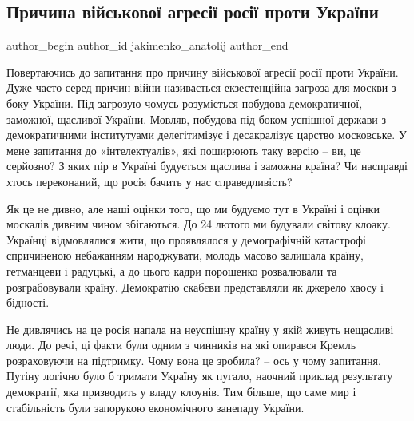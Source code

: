  
 
 
 
 
 
\subsection{Причина військової агресії росії проти України}
\label{sec:29_03_2022.fb.jakimenko_anatolij.1.prichina_agressii}
 
\ifcmt
 author_begin
   author_id jakimenko_anatolij
 author_end
\fi

Повертаючись до запитання про причину військової агресії росії проти України.
Дуже часто серед причин війни називається екзестенційна загроза для москви з
боку України. Під загрозую чомусь розуміється побудова демократичної, заможної,
щасливої України. Мовляв, побудова під боком успішної держави з демократичними
інститутуами делегітимізує і десакралізує царство московське. У мене запитання
до «інтелектуалів», які поширюють таку версію – ви, це серйозно? З яких пір в
Україні будується щаслива і заможна країна? Чи насправді хтось переконаний, що
росія бачить у нас справедливість? 

Як це не дивно, але наші оцінки того, що ми будуємо тут в Україні і оцінки
москалів дивним чином збігаються. До 24 лютого ми будували світову клоаку.
Українці відмовлялися жити, що проявлялося у демографічній катастрофі
спричиненою небажанням народжувати, молодь масово залишала країну, гетманцеви і
радуцькі, а до цього кадри порошенко розвалювали та розграбовували країну.
Демократію скабєви представляли як джерело хаосу і бідності. 

Не дивлячись на це росія напала на неуспішну країну у якій живуть нещасливі
люди. До речі, ці факти були одним з чинників на які опирався Кремль
розраховуючи на підтримку. Чому вона це зробила? – ось у чому запитання. Путіну
логічно було б тримати Україну як пугало, наочний приклад результату
демократії, яка призводить у владу клоунів. Тим більше, що саме мир і
стабільність були запорукою економічного занепаду України. 

